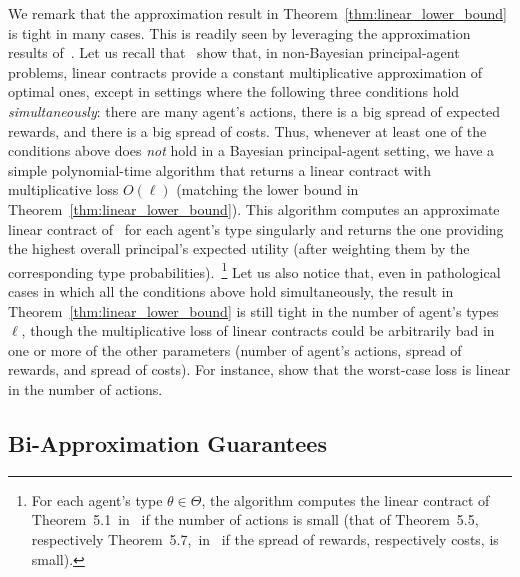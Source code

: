 We remark that the approximation result in Theorem~\ref{thm:linear_lower_bound} is tight in many cases.
%
%
This is readily seen by leveraging the approximation results of~\citet{dutting2019simple}.
%
Let us recall that~\citet{dutting2019simple} show that, in non-Bayesian principal-agent problems, linear contracts provide a constant multiplicative approximation of optimal ones, except in settings where the following three conditions hold \emph{simultaneously}: there are many agent's actions, there is a big spread of expected rewards, and there is a big spread of costs.
%
Thus, whenever at least one of the conditions above does \emph{not} hold in a Bayesian principal-agent setting, we have a simple polynomial-time algorithm that returns a linear contract with multiplicative loss $O(\ell)$ (matching the lower bound in Theorem~\ref{thm:linear_lower_bound}).
%
This algorithm computes an approximate linear contract of~\citet{dutting2019simple} for each agent's type {singularly} and returns the one providing the highest overall principal's expected utility (after weighting them by the corresponding type probabilities).~\footnote{For each agent's type $\theta \in \Theta$, the algorithm computes the linear contract of Theorem~5.1~in~\citep{dutting2019simple} if the number of actions is small (that of Theorem~5.5, respectively Theorem~5.7,~in~\citep{dutting2019simple} if the spread of rewards, respectively costs, is small).}
%
%
Let us also notice that, even in pathological cases in which all the conditions above hold simultaneously, the result in Theorem~\ref{thm:linear_lower_bound} is still tight in the number of agent's types $\ell$, though the multiplicative loss of linear contracts could be arbitrarily bad in one or more of the other parameters (number of agent's actions, spread of rewards, and spread of costs).
%
{For instance, \citet{guruganesh2020contracts} show that the worst-case loss is linear in the number of actions.}



\subsection{Bi-Approximation Guarantees}\label{sec:linear_bi_apx}

